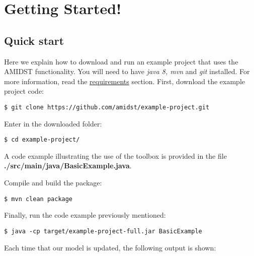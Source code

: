 \documentclass[10pt,a4paper]{report}
\begin{document}
\chapter{Getting Started! }\label{getting-started}



\section{Quick start}

Here we explain how to download and run an example project that uses the AMIDST functionality.  You will need to have \textit{java 8, mvn} and \textit{git} installed. For more information, read the \href{requirements.html}{requirements} section.  First, download the example project code:


\begin{verbatim}
$ git clone https://github.com/amidst/example-project.git
\end{verbatim}

Enter in the downloaded folder:
\begin{verbatim}
$ cd example-project/
\end{verbatim}

A code example illustrating the use of the toolbox is provided in the file \textbf{./src/main/java/BasicExample.java}.

Compile and build the package:

\begin{verbatim}
$ mvn clean package
\end{verbatim}

Finally, run the code example previously mentioned:


\begin{verbatim}
$ java -cp target/example-project-full.jar BasicExample
\end{verbatim}

Each time that our model is updated, the following output is shown:
\end{document}
